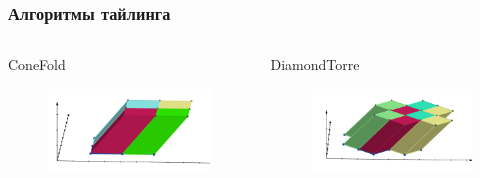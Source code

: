 \documentclass[presentation,18pt]{beamer}
\begin{document}
\begin{frame}[t]
	\label{tiling}
	\frametitle{Алгоритмы тайлинга}

	\begin{columns}

		\begin{block}{ConeFold}
			\begin{figure}
				\includegraphics[width=\textwidth]{img/CropConeFold.png}
			\end{figure}
		\end{block}

		\begin{block}{DiamondTorre}
			\begin{figure}
				\includegraphics[width=\textwidth]{img/CropDiamondTorre.png}
			\end{figure}
		\end{block}


\end{columns}
\end{frame}
\end{document}
